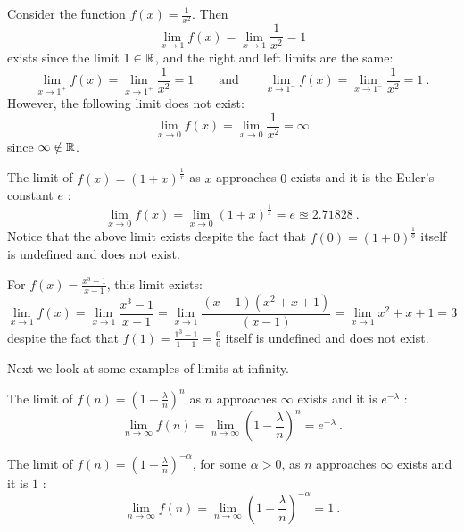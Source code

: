 \begin{example}[Limit of $1/x^2$]
Consider the function $f(x)=\frac{1}{x^2}$.  Then
\[
\lim_{x \to 1} f(x) = \lim_{x \to 1} \frac{1}{x^2} = 1
\]
exists since the limit $1 \in \mathbb{R}$, and the right and left limits are the same:
\[
\lim_{x \to 1^+} f(x) = \lim_{x \to 1^+} \frac{1}{x^2} = 1 \qquad \text{and} \qquad 
\lim_{x \to 1^-} f(x) = \lim_{x \to 1^-} \frac{1}{x^2} = 1 \ .
\]
However, the following limit does not exist:
\[
\lim_{x \to 0} f(x) = \lim_{x \to 0} \frac{1}{x^2} = \infty
\]
since $\infty \notin \mathbb{R}$.
\end{example}

\begin{example}
The limit of $f(x)=(1+x)^{\frac{1}{x}}$ as $x$ approaches $0$ exists and it is the Euler's constant $e$ :
\[
\lim_{x \to 0} f(x) = \lim_{x \to 0} (1+x)^{\frac{1}{x}} = e \approxeq 2.71828 \ .
\]
Notice that the above limit exists despite the fact that $f(0) = (1+0)^{\frac{1}{0}}$ itself is undefined and does not exist.
\end{example}

\begin{example}
For $f(x)=\frac{x^3-1}{x-1}$, this limit exists:
\[
\lim_{x \to 1} f(x) = \lim_{x \to 1} \frac{x^3-1}{x-1}
=  \lim_{x \to 1} \frac{(x-1)(x^2+x+1)}{(x-1)}
= \lim_{x \to 1} x^2+x+1 = 3 \,
\]
despite the fact that $f(1)=\frac{1^3-1}{1-1}=\frac{0}{0}$ itself is undefined and does not exist.
\end{example}

Next we look at some examples of limits at infinity.
\begin{example}\label{EX:LimitExpofLambda} 
The limit of $f(n)=\left( 1-\frac{\lambda}{n} \right)^n$ as $n$ approaches $\infty$ exists and it is $e^{-\lambda}$ :
\[
\lim_{n \to \infty} f(n) = \lim_{n \to \infty} \left( 1-\frac{\lambda}{n} \right)^n = e^{-\lambda} \ .
\]
\end{example}

\begin{example}\label{EX:Limit1MinusLambdaOverNToMinusK} 
The limit of $f(n)=\left( 1-\frac{\lambda}{n} \right)^{-\alpha}$, for some $\alpha>0$, as $n$ approaches $\infty$ exists and it is $1$ :
\[
\lim_{n \to \infty} f(n) = \lim_{n \to \infty} \left( 1-\frac{\lambda}{n} \right)^{-\alpha} = 1 \ .
\]
\end{example}

